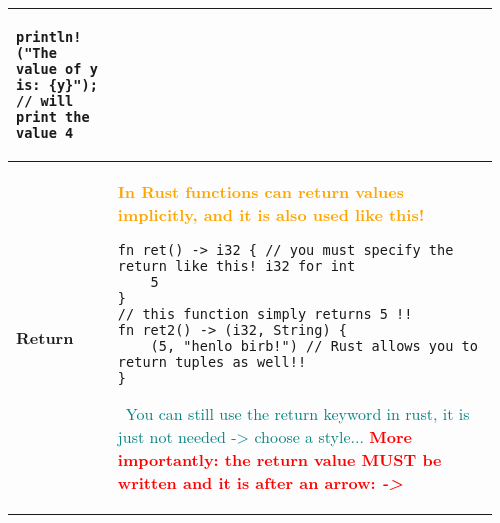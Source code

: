 \documentclass[main.tex,fontsize=8pt,paper=a4,paper=portrait,DIV=calc,]{scrartcl}
\begin{document}
\begin{table}[ht!]
\begin{tabular}{|m{0.2\linewidth}|m{0.755\linewidth}|}
\begin{lstlisting}
println!("The value of y is: {y}");
// will print the value 4
\end{lstlisting}\\
\hline
\textbf{Return} & 
\textcolor{orange}{\textbf{In Rust functions can return values implicitly, and it is also used like this!}}\newline
\begin{lstlisting}
fn ret() -> i32 { // you must specify the return like this! i32 for int
    5
}
// this function simply returns 5 !!
fn ret2() -> (i32, String) {
    (5, "henlo birb!") // Rust allows you to return tuples as well!!
}
\end{lstlisting}
\, \newline
\textcolor{teal}{You can still use the return keyword in rust, it is just not needed -> choose a style...}\newline
\textcolor{red}{\textbf{More importantly: the return value MUST be written and it is after an arrow: \emph{->}}}\\
\hline
\end{tabular}
\end{table}
\pagebreak
\end{document}
